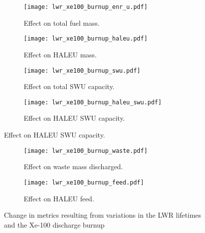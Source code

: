 \begin{figure}
    \begin{subfigure}[t]{0.48\textwidth}
        \centering
        \texttt{[image: lwr\_xe100\_burnup\_enr\_u.pdf]}
        \caption{Effect on total fuel mass.}
        \label{fig:lwr_xe100_burnup_enr_u}
    \end{subfigure}
    \hfill
    \begin{subfigure}[t]{0.48\textwidth}
        \centering
        \texttt{[image: lwr\_xe100\_burnup\_haleu.pdf]}
        \caption{Effect on HALEU mass.}
        \label{fig:lwr_xe100_burnup_haleu}
    \end{subfigure}
    
    \begin{subfigure}[t]{0.48\textwidth}
        \centering
        \texttt{[image: lwr\_xe100\_burnup\_swu.pdf]}
        \caption{Effect on total SWU capacity.}
        \label{fig:lwr_xe100_burnup_swu}
    \end{subfigure}
    \hfill
    \begin{subfigure}[t]{0.48\textwidth}
        \centering
        \texttt{[image: lwr\_xe100\_burnup\_haleu\_swu.pdf]}
        \caption{Effect on HALEU SWU capacity.}
        \label{fig:lwr_xe100_burnup_haleu_swu}
    \end{subfigure}
\end{figure}

\begin{figure}
    \ContinuedFloat    
    \begin{subfigure}[t]{0.48\textwidth}
        \centering
        \texttt{[image: lwr\_xe100\_burnup\_waste.pdf]}
        \caption{Effect on waste mass discharged.}
        \label{fig:lwr_xe100_burnup_waste}
    \end{subfigure}
    \hfill
    \begin{subfigure}[t]{0.48\textwidth}
        \centering
        \texttt{[image: lwr\_xe100\_burnup\_feed.pdf]}
        \caption{Effect on HALEU feed.}
        \label{fig:lwr_xe100_burnup_feed}
    \end{subfigure}
    \caption{Change in metrics resulting from variations in the 
    LWR lifetimes and the Xe-100 discharge burnup}
    \label{fig:lwr_xe100_burnup}
\end{figure}


